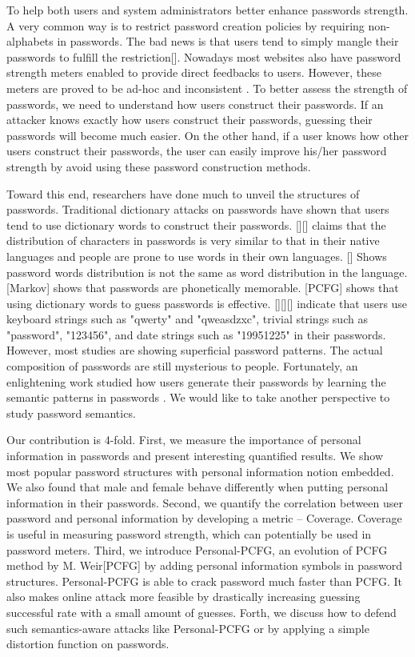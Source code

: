 \documentclass{sig-alternate}
\begin{document}
To help both users and system administrators better enhance passwords strength. A very common way is to restrict password creation policies by requiring non-alphabets in passwords. The bad news is that users tend to simply mangle their passwords to fulfill the restriction[]. Nowadays most websites also have password strength meters enabled to provide direct feedbacks to users. However, these meters are proved to be ad-hoc and inconsistent \cite{de2014very}. To better assess the strength of passwords, we need to understand how users construct their passwords. If an attacker knows exactly how users construct their passwords, guessing their passwords will become much easier. On the other hand, if a user knows how other users construct their passwords, the user can easily improve his/her password strength by avoid using these password construction methods. 

Toward this end, researchers have done much to unveil the structures of passwords. Traditional dictionary attacks on passwords have shown that users tend to use dictionary words to construct their passwords. [][] claims that the distribution of characters in passwords is very similar to that in their native languages and people are prone to use words in their own languages. [] Shows password words distribution is not the same as word distribution in the language. [Markov] shows that passwords are phonetically memorable. [PCFG] shows that using dictionary words to guess passwords is effective. [][][] indicate that users use keyboard strings such as "qwerty" and "qweasdzxc", trivial strings such as "password", "123456", and date strings such as "19951225" in their passwords. However, most studies are showing superficial password patterns. The actual composition of passwords are still mysterious to people. Fortunately, an enlightening work studied how users generate their passwords by learning the semantic patterns in passwords \cite{veras2014semantic}. We would like to take another perspective to study password semantics. 

Our contribution is 4-fold. First, we measure the importance of personal information in passwords and present interesting quantified results. We show most popular password structures with personal information notion embedded. We also found that male and female behave differently when putting personal information in their passwords. Second, we quantify the correlation between user password and personal information by developing a metric -- Coverage. Coverage is useful in measuring password strength, which can potentially be used in password meters. Third, we introduce Personal-PCFG, an evolution of PCFG method by M. Weir[PCFG] by adding personal information symbols in password structures. Personal-PCFG is able to crack password much faster than PCFG. It also makes online attack more feasible by drastically increasing guessing successful rate with a small amount of guesses. Forth, we discuss how to defend such semantics-aware attacks like Personal-PCFG or \cite{veras2014semantic} by applying a simple distortion function on passwords. 
\end{document}
